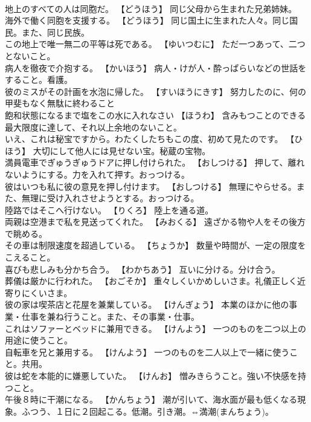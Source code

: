 \documentclass[8pt]{extreport}
\begin{document}
\begin{CJK}{UTF8}{min}
\\	地上のすべての人は同胞だ。	【どうほう】 同じ父母から生まれた兄弟姉妹。
\\	海外で働く同胞を支援する。	【どうほう】 同じ国土に生まれた人々。同じ国民。また、同じ民族。
\\	この地上で唯一無二の平等は死である。	【ゆいつむに】 ただ一つあって、二つとないこと。
\\	病人を徹夜で介抱する。	【かいほう】 病人・けが人・酔っぱらいなどの世話をすること。看護。
\\	彼のミスがその計画を水泡に帰した。	【すいほうにきす】 努力したのに、何の甲斐もなく無駄に終わること
\\	飽和状態になるまで塩をこの水に入れなさい	【ほうわ】 含みもつことのできる最大限度に達して、それ以上余地のないこと。
\\	いえ、これは秘宝ですから。わたくしたちもこの度、初めて見たのです。	【ひほう】 大切にして他人には見せない宝。秘蔵の宝物。
\\	満員電車でぎゅうぎゅうドアに押し付けられた。	【おしつける】 押して、離れないようにする。力を入れて押す。おっつける。
\\	彼はいつも私に彼の意見を押し付けます。	【おしつける】 無理にやらせる。また、無理に受け入れさせようとする。おっつける。
\\	陸路ではそこへ行けない。	【りくろ】 陸上を通る道。
\\	両親は空港まで私を見送ってくれた。	【みおくる】 遠ざかる物や人をその後方で眺める。
\\	その車は制限速度を超過している。	【ちょうか】 数量や時間が、一定の限度をこえること。
\\	喜びも悲しみも分かち合う。	【わかちあう】 互いに分ける。分け合う。
\\	葬儀は厳かに行われた。	【おごそか】 重々しくいかめしいさま。礼儀正しく近寄りにくいさま。
\\	彼の家は喫茶店と花屋を兼業している。	【けんぎょう】 本業のほかに他の事業・仕事を兼ね行うこと。また、その事業・仕事。
\\	これはソファーとベッドに兼用できる。	【けんよう】 一つのものを二つ以上の用途に使うこと。
\\	自転車を兄と兼用する。	【けんよう】 一つのものを二人以上で一緒に使うこと。共用。
\\	彼は蛇を本能的に嫌悪していた。	【けんお】 憎みきらうこと。強い不快感を持つこと。
\\	午後８時に干潮になる。	【かんちょう】 潮が引いて、海水面が最も低くなる現象。ふつう、１日に２回起こる。低潮。引き潮。⇔満潮(まんちょう)。

\end{CJK}
\end{document}
